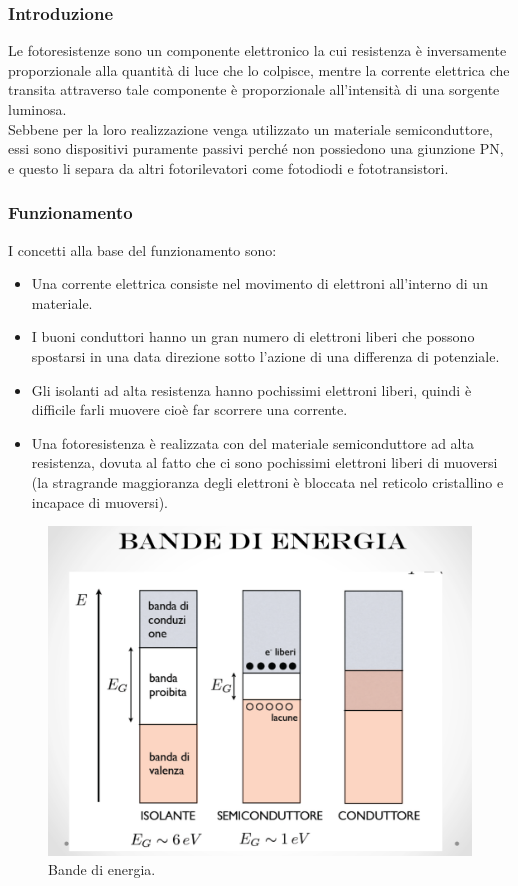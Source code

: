 \documentclass[12pt,oneside,a4paper]{article}
\begin{document}
\subsubsection{Introduzione}
Le fotoresistenze\cite{Photoresistor1}\cite{Photoresistor2}\cite{Photoresistor3} sono un componente elettronico la cui resistenza è inversamente proporzionale alla quantità di luce che lo colpisce, mentre la corrente elettrica che transita attraverso tale componente è proporzionale all'intensità di una sorgente luminosa.
\\Sebbene per la loro realizzazione venga utilizzato un materiale semiconduttore, essi sono dispositivi puramente passivi perché non possiedono una giunzione PN, e questo li separa da altri fotorilevatori come fotodiodi e fototransistori.


\subsubsection{Funzionamento}
I concetti alla base del funzionamento sono:
\begin{itemize}
    \item Una corrente elettrica consiste nel movimento di elettroni all'interno di un materiale.
    \item I buoni conduttori hanno un gran numero di elettroni liberi che possono spostarsi in una data direzione sotto l'azione di una differenza di potenziale.
    \item Gli isolanti ad alta resistenza hanno pochissimi elettroni liberi, quindi è difficile farli muovere cioè far scorrere una corrente.
    \item Una fotoresistenza è realizzata con del materiale semiconduttore ad alta resistenza, dovuta al fatto che ci sono pochissimi elettroni liberi di muoversi (la stragrande maggioranza degli elettroni è bloccata nel reticolo cristallino e incapace di muoversi).
\end{itemize}

\begin{figure}[!htb]
    \centering
    \includegraphics[width=0.45\linewidth]{figures/bande-energia.png}
    \caption{Bande di energia.}
\end{figure}
\end{document}
